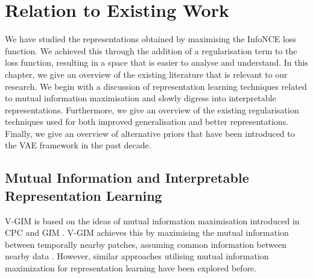 %
%
%

\chapter{Relation to Existing Work} \label{cha:5}

We have studied the representations obtained by maximising the InfoNCE loss function. We achieved this through the addition of a regularisation term to the loss function, resulting in a space that is easier to analyse and understand. In this chapter, we give an overview of the existing literature that is relevant to our research. We begin with a discussion of representation learning techniques related to mutual information maximisation and slowly digress into interpretable representations. Furthermore, we give an overview of the existing regularisation techniques used for both improved generalisation and better representations. Finally, we give an overview of alternative priors that have been introduced to the VAE framework in the past decade.


\section{Mutual Information and Interpretable Representation Learning}

	V-GIM is based on the ideas of mutual information maximisation introduced in CPC and GIM \citep{lowePuttingEndEndtoEnd2020a, oordRepresentationLearningContrastive2019}. V-GIM achieves this by maximising the mutual information between temporally nearby patches, assuming common information between nearby data \citep{lowePuttingEndEndtoEnd2020a}. However, similar approaches utilising mutual information maximization for representation learning have been explored before.
	
